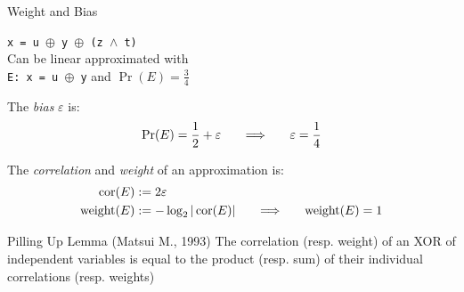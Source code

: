 \documentclass[aspectratio=169,10pt,webfont]{beamer}
\begin{document}
\begin{frame}{Weight and Bias}

\begin{center}
\texttt{x = u $\oplus$ y $\oplus$ (z $\land$ t)}\\
Can be linear approximated with\\
\texttt{E: x = u $\oplus$ y} \hspace{0.5cm} and \hspace{0.5cm} $\Pr(E) = \frac{3}{4}$
\end{center}
The {\it bias} $\varepsilon$ is:
\begin{align*}
\Pr(E) = \frac{1}{2} + \varepsilon \hspace{0.5cm} \implies \hspace{0.5cm} \varepsilon = \frac{1}{4}
\end{align*}

The {\it correlation} and {\it weight} of an approximation is:
\begin{align*}
\operatorname{cor}(E) &:= 2 \varepsilon \\
\operatorname{weight}(E) &:= -\log_2|\operatorname{cor}(E)|  \hspace{0.5cm} \implies \hspace{0.5cm} \operatorname{weight}(E) = 1
\end{align*}

\begin{alertblock}{Pilling Up Lemma (Matsui M., 1993)}
  The correlation (resp. weight) of an XOR of independent variables is equal to
  the product (resp. sum) of their individual correlations (resp. weights)
\end{alertblock}

\end{frame}

\end{document}
